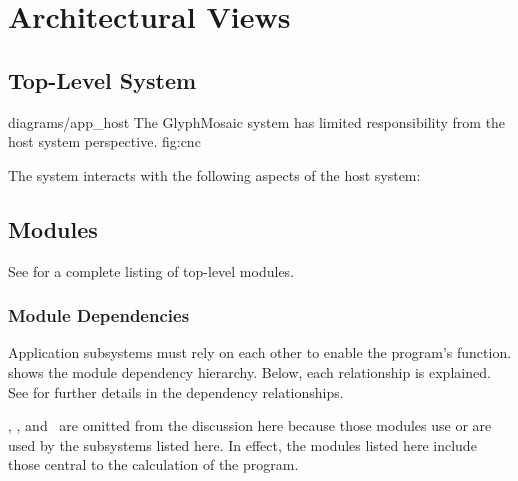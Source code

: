 \section{Architectural Views}
\label{sec:views}
\subsection{Top-Level System}
\sidiagram
{diagrams/app_host}
{The GlyphMosaic system has limited responsibility from the host system perspective.}
{fig:cnc}
{\diagsize}

The system interacts with the following aspects of the host system:
\begin{itemize}
\end{itemize}


\subsection{Modules}
\label{sec:modules}
See  for a complete listing of top-level modules.


\subsubsection{Module Dependencies}
Application subsystems must rely on each other to enable the program's function.
 shows the module dependency hierarchy.
Below, each relationship is explained.
See  for further details in the dependency relationships.

\docmod, \uimod, and \bmmod\ are omitted from the discussion here because those modules use or are used by the subsystems listed here.
In effect, the modules listed here include those central to the calculation of the program.

